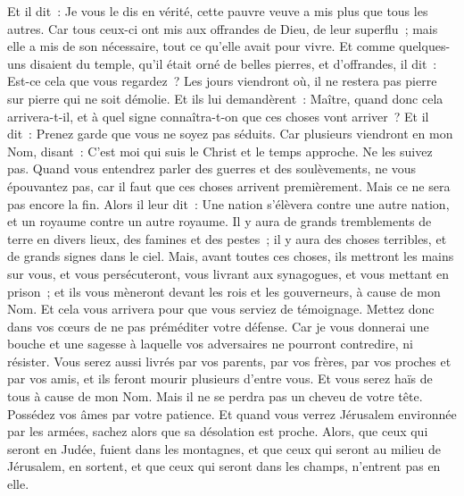 \begin{multicols}{2}
Et il dit~: Je vous le dis en vérité, cette pauvre veuve a mis plus que tous les autres.
Car tous ceux-ci ont mis aux offrandes de Dieu, de leur superflu~; mais elle a mis de son nécessaire, tout ce qu'elle avait pour vivre.
Et comme quelques-uns disaient du temple, qu'il était orné de belles pierres, et d'offrandes, il dit~:
Est-ce cela que vous regardez~? Les jours viendront où, il ne restera pas pierre sur pierre qui ne soit démolie.
Et ils lui demandèrent~: Maître, quand donc cela arrivera-t-il, et à quel signe connaîtra-t-on que ces choses vont arriver~?
Et il dit~: Prenez garde que vous ne soyez pas séduits. Car plusieurs viendront en mon Nom, disant~: C'est moi qui suis le Christ et le temps approche. Ne les suivez pas.
Quand vous entendrez parler des guerres et des soulèvements, ne vous épouvantez pas, car il faut que ces choses arrivent premièrement. Mais ce ne sera pas encore la fin.
Alors il leur dit~: Une nation s'élèvera contre une autre nation, et un royaume contre un autre royaume.
Il y aura de grands tremblements de terre en divers lieux, des famines et des pestes~; il y aura des choses terribles, et de grands signes dans le ciel.
Mais, avant toutes ces choses, ils mettront les mains sur vous, et vous persécuteront, vous livrant aux synagogues, et vous mettant en prison~; et ils vous mèneront devant les rois et les gouverneurs, à cause de mon Nom.
Et cela vous arrivera pour que vous serviez de témoignage.
Mettez donc dans vos cœurs de ne pas préméditer votre défense.
Car je vous donnerai une bouche et une sagesse à laquelle vos adversaires ne pourront contredire, ni résister.
Vous serez aussi livrés par vos parents, par vos frères, par vos proches et par vos amis, et ils feront mourir plusieurs d'entre vous.
Et vous serez haïs de tous à cause de mon Nom.
Mais il ne se perdra pas un cheveu de votre tête.
Possédez vos âmes par votre patience.
Et quand vous verrez Jérusalem environnée par les armées, sachez alors que sa désolation est proche.
Alors, que ceux qui seront en Judée, fuient dans les montagnes, et que ceux qui seront au milieu de Jérusalem, en sortent, et que ceux qui seront dans les champs, n'entrent pas en elle.

\end{multicols}
